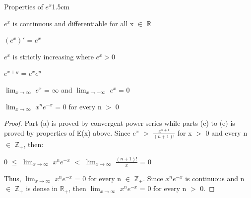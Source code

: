     \begin{ltheorem}{Properties of $e^x$}{1.5cm}
        \item $e^x$ is continuous and differentiable for all x $\in$ $\mathbb{R}$
        
        
        \item $(e^x)'$ = $e^x$
        

        \item $e^x$ is strictly increasing where $e^x > 0$
        

        \item $e^{x+y}$ = $e^x e^y$
        

        \item $\lim_{x \rightarrow \infty}$ $e^x$ = $\infty$
                and $\lim_{x \rightarrow -\infty}$ $e^x$ = 0


        \item $\lim_{x \rightarrow \infty}$ $x^n e^{-x}$ = 0 for every n $>$ 0
    \end{ltheorem}

    \begin{proof}
        Part (a) is proved by convergent power series
        while parts (c) to (e) is proved by properties of E(x) above.
        Since $e^x$ $>$ $\frac{x^{n+1}}{(n+1)!}$ for x $>$ 0 and
        every n $\in$ $\mathbb{Z}_+$, then:

        \hspace{0.5cm}
        0 $\leq$ $\lim_{x \rightarrow \infty}$ $x^n e^{-x}$
        $<$ $\lim_{x \rightarrow \infty}$ $\frac{(n+1)!}{x}$ = 0

        Thus, $\lim_{x \rightarrow \infty}$ $x^n e^{-x}$ = 0 for
        every n $\in$ $\mathbb{Z}_+$.
        Since $x^n e^{-x}$ is continuous and n $\in$ $\mathbb{Z}_+$
        is dense in $\mathbb{R}_+$, then
        $\lim_{x \rightarrow \infty}$ $x^n e^{-x}$ = 0 for every n $>$ 0.
    \end{proof}

    \newpage




